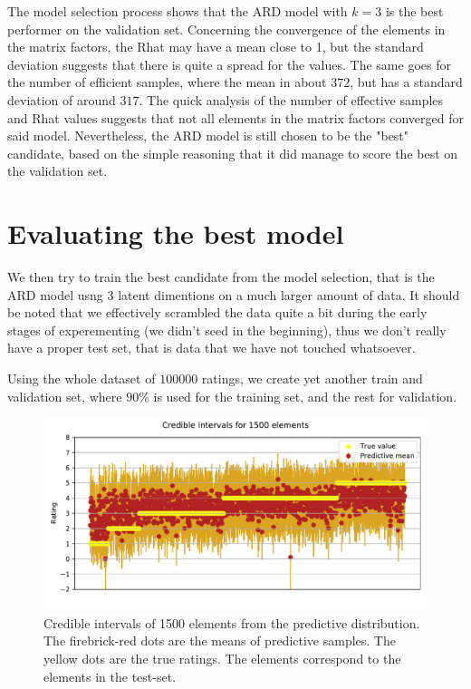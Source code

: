\documentclass[12pt]{article}
\begin{document}
    The model selection process shows that the ARD model with $k=3$ is the best performer on the validation set. Concerning the convergence of the elements in the matrix factors, the Rhat may have a mean close to 1, but the standard deviation suggests that there is quite a spread for the values. The same goes for the number of efficient samples, where the mean in about $372$, but has a standard deviation of around $317$. The quick analysis of the number of effective samples and Rhat values suggests that not all elements in the matrix factors converged for said model. Nevertheless, the ARD
    model is still chosen to be the "best" candidate, based on the simple reasoning that it did manage to score the best on the
    validation set.

    \section{Evaluating the best model}
    We then try to train the best candidate from the model selection, that is the ARD model usng $3$ latent dimentions on a much larger amount of data. It should be noted that we effectively scrambled the data quite a bit during the early stages of experementing (we didn't seed in the beginning), thus we don't really have a proper test set, that is data that we have not touched whatsoever.
    
    \vspace{5mm}
    Using the whole dataset of $100000$ ratings, we create yet another train and validation set, where $90\%$ is used for the training set, and the rest for validation.

    \begin{figure}[H]
        \centering
        \caption{Credible intervals of 1500 elements from the predictive distribution. The firebrick-red dots are the means of predictive samples. The yellow dots are the true ratings. The elements correspond to the elements in the test-set.}
        \includegraphics[width=\textwidth]{credibles.pdf}
    \end{figure}

% 


\end{document}
